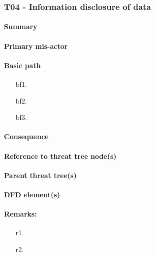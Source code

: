\subsubsection{T04 - Information disclosure of data}

\paragraph{Summary}
\paragraph{Primary mis-actor}
\paragraph{Basic path}
\begin{enumerate}
	\item[bf1.]{}
    \item[bf2.]{}
    \item[bf3.]{}
\end{enumerate}
\paragraph{Consequence}
\paragraph{Reference to threat tree node(s)}
\paragraph{Parent threat tree(s)}
\paragraph{DFD element(s)}
\paragraph{Remarks:}
	\begin{enumerate}
         \item[r1.]
         \item[r2.]
    \end{enumerate}
